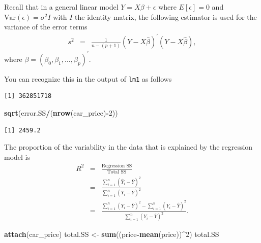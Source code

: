 \documentclass[
]{book}
\newenvironment{Shaded}{\begin{snugshade}}{\end{snugshade}}
\newcommand{\DecValTok}[1]{\textcolor[rgb]{0.00,0.00,0.81}{#1}}
\newcommand{\KeywordTok}[1]{\textcolor[rgb]{0.13,0.29,0.53}{\textbf{#1}}}
\newcommand{\NormalTok}[1]{#1}
\newcommand{\OperatorTok}[1]{\textcolor[rgb]{0.81,0.36,0.00}{\textbf{#1}}}
\newcommand{\StringTok}[1]{\textcolor[rgb]{0.31,0.60,0.02}{#1}}
\begin{document}
Recall that in a general linear model \(Y = X\beta + \epsilon\) where \(E[\epsilon]=0\) and \(\text{Var}(\epsilon)=\sigma^2 I\) with \(I\) the identity matrix, the following estimator is used for the variance of the error terms
\begin{eqnarray*}
s^2 &=& \frac{1}{n-(p+1)}(Y-X\hat{\beta})^{'}(Y-X\hat{\beta}),
\end{eqnarray*}
where \(\beta = (\beta_0, \beta_1, \ldots, \beta_p)^{'}\).

You can recognize this in the output of \texttt{lm1} as follows

\begin{Shaded}
\end{Shaded}

\begin{verbatim}
[1] 362851718
\end{verbatim}

\begin{Shaded}
\begin{Highlighting}[]
\KeywordTok{sqrt}\NormalTok{(error.SS}\OperatorTok{/}\NormalTok{(}\KeywordTok{nrow}\NormalTok{(car_price)}\OperatorTok{-}\DecValTok{2}\NormalTok{))}
\end{Highlighting}
\end{Shaded}

\begin{verbatim}
[1] 2459.2
\end{verbatim}

The proportion of the variability in the data that is explained by the regression model is
\begin{eqnarray*}
R^2 &=& \frac{\text{Regression SS}}{\text{Total SS}} \\
&=& \frac{\sum_{i=1}^n (\hat{Y}_i-\bar{Y})^2}{\sum_{i=1}^n (Y_i-\bar{Y})^2} \\
&=& \frac{\sum_{i=1}^n (Y_i-\bar{Y})^2 - \sum_{i=1}^n (Y_i-\hat{Y})^2}{\sum_{i=1}^n (Y_i-\bar{Y})^2}.
\end{eqnarray*}

\begin{Shaded}
\begin{Highlighting}[]
\KeywordTok{attach}\NormalTok{(car_price)}
\NormalTok{total.SS <-}\StringTok{ }\KeywordTok{sum}\NormalTok{((price}\OperatorTok{-}\KeywordTok{mean}\NormalTok{(price))}\OperatorTok{^}\DecValTok{2}\NormalTok{)}
\NormalTok{total.SS}
\end{Highlighting}
\end{Shaded}
\end{document}
